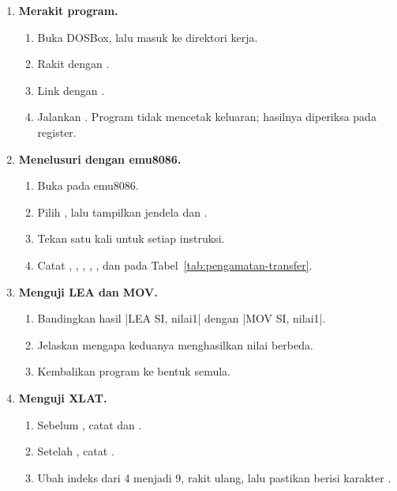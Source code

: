 \begin{enumerate}
    \item \textbf{Merakit program.}
    \begin{enumerate}
        \item Buka DOSBox, lalu masuk ke direktori kerja.
        \item Rakit dengan .
        \item Link dengan .
        \item Jalankan . Program tidak mencetak
              keluaran; hasilnya diperiksa pada register.
    \end{enumerate}

    \item \textbf{Menelusuri dengan emu8086.}
    \begin{enumerate}
        \item Buka  pada emu8086.
        \item Pilih , lalu tampilkan
              jendela  dan .
        \item Tekan  satu kali untuk setiap
              instruksi.
        \item Catat , , , ,
              , dan  pada
              Tabel~\ref{tab:pengamatan-transfer}.
    \end{enumerate}

    \item \textbf{Menguji LEA dan MOV.}
    \begin{enumerate}
        \item Bandingkan hasil \lstasm|LEA SI, nilai1| dengan
              \lstasm|MOV SI, nilai1|.
        \item Jelaskan mengapa keduanya menghasilkan nilai berbeda.
        \item Kembalikan program ke bentuk semula.
    \end{enumerate}

    \item \textbf{Menguji XLAT.}
    \begin{enumerate}
        \item Sebelum , catat  dan .
        \item Setelah , catat .
        \item Ubah indeks dari 4 menjadi 9, rakit ulang, lalu
              pastikan  berisi karakter .
    \end{enumerate}


\end{enumerate}
